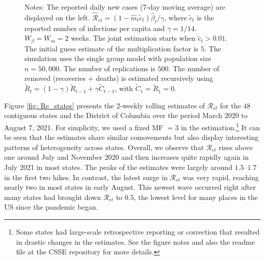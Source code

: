 \documentclass[12pt]{article}
\begin{document}
\begin{figure}[tbh]
\begin{footnotesize}
%

\vspace{0cm}%
\footnotesize
Notes: The reported daily new cases (7-day moving average) are displayed on
the left. $\mathcal{\hat{R}}_{et}=\left(  1-\hat{m}_{t}\tilde{c}_{t}\right)
\hat{\beta}_{t}/\gamma$, where $\tilde{c}_{t}$ is the reported number of
infections per capita and $\gamma=1/14.$ $W_{\beta}=W_{m}=2$ weeks. The joint
estimation starts when $\tilde{c}_{t}>0.01$. The initial guess estimate of the
multiplication factor is $5$. The simulation uses the single group model with
population size $n=50,000$. The number of replications is $500$. The number of
removed (recoveries + deaths) is estimated recursively using $\tilde{R}%
_{t}=\left(  1-\gamma\right)  \tilde{R}_{t-1}+\gamma\tilde{C}_{t-1}$, with
$\tilde{C}_{1}=\tilde{R}_{1}=0$.%

\end{footnotesize}%
%

\end{figure}%


Figure \ref{fig: Re_states} presents the 2-weekly rolling estimates of
$\mathcal{R}_{et}$ for the $48$ contiguous states and the District of Columbia
over the period March 2020 to August 7, 2021. For simplicity, we used a fixed
MF $=3$ in the estimation.\footnote{Some states had large-scale retrospective
reporting or correction that resulted in drastic changes in the estimates. See
the figure notes and also the readme file at the CSSE repository for more
details.} It can be seen that the estimates share similar comovements but also
display interesting patterns of heterogeneity across states. Overall, we
observe that $\mathcal{R}_{et}$ rises above one around July and November 2020
and then increases quite rapidly again in July 2021 in most states. The peaks
of the estimates were largely around $1.5$--$1.7$ in the first two hikes. In
contrast, the latest surge in $\mathcal{R}_{et}$ was very rapid, reaching
nearly two in most states in early August. This newest wave occurred right
after many states had brought down $\mathcal{R}_{et}$ to $0.5$, the lowest
level for many places in the US since the pandemic began.%
\end{document}
